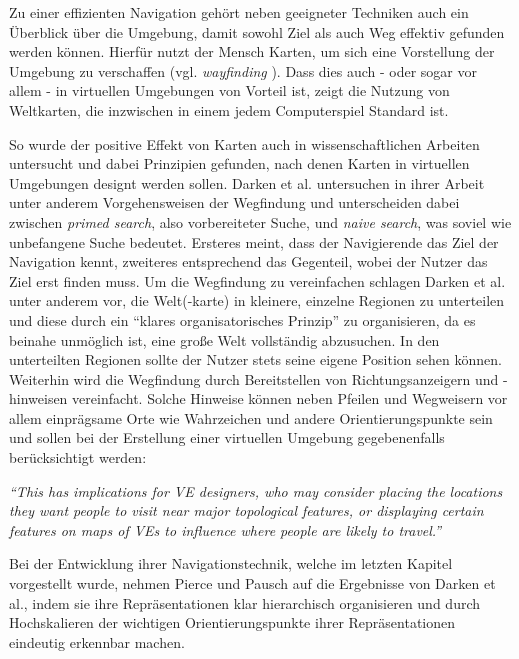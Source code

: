 Zu einer effizienten Navigation gehört neben geeigneter Techniken auch ein Überblick über die Umgebung, damit sowohl Ziel als auch Weg effektiv gefunden werden können.
Hierfür nutzt der Mensch Karten, um sich eine Vorstellung der Umgebung zu verschaffen (vgl. \textit{wayfinding} \cite{Bowman2001AnDesign}). Dass dies auch - oder sogar vor allem - in virtuellen Umgebungen von Vorteil ist, zeigt die Nutzung von Weltkarten, die inzwischen in einem jedem Computerspiel Standard ist. 

So wurde der positive Effekt von Karten auch in wissenschaftlichen Arbeiten untersucht und dabei Prinzipien gefunden, nach denen Karten in virtuellen Umgebungen designt werden sollen.
Darken et al. \cite{12_Darken1996_WayfindingStrategies} untersuchen in ihrer Arbeit unter anderem Vorgehensweisen der Wegfindung und unterscheiden dabei zwischen \textit{primed search}, also vorbereiteter Suche, und \textit{naive search}, was soviel wie unbefangene Suche bedeutet.
Ersteres meint, dass der Navigierende das Ziel der Navigation kennt, zweiteres entsprechend das Gegenteil, wobei der Nutzer das Ziel erst finden muss.
Um die Wegfindung zu vereinfachen schlagen Darken et al. unter anderem vor, die Welt(-karte) in kleinere, einzelne Regionen zu unterteilen und diese durch ein “klares organisatorisches Prinzip” zu organisieren, da es beinahe unmöglich ist, eine große Welt vollständig abzusuchen. In den unterteilten Regionen sollte der Nutzer stets seine eigene Position sehen können. 
Weiterhin wird die Wegfindung durch Bereitstellen von Richtungsanzeigern und -hinweisen vereinfacht. Solche Hinweise können neben Pfeilen und Wegweisern vor allem einprägsame Orte wie Wahrzeichen und andere Orientierungspunkte sein und sollen bei der Erstellung einer virtuellen Umgebung gegebenenfalls berücksichtigt werden:

\begin{addmargin}[25pt]{0pt} 

\textit{“This has implications for VE designers, who may consider placing the locations they want
people to visit near major topological features, or displaying certain features on maps of
VEs to influence where people are likely to travel.”} \cite{12_Darken1996_WayfindingStrategies}

\end{addmargin}

Bei der Entwicklung ihrer Navigationstechnik, welche im letzten Kapitel vorgestellt wurde, nehmen Pierce und Pausch \cite{pierce_representations} auf die Ergebnisse von Darken et al., indem sie ihre Repräsentationen klar hierarchisch organisieren und durch Hochskalieren der wichtigen Orientierungspunkte ihrer Repräsentationen eindeutig erkennbar machen.

